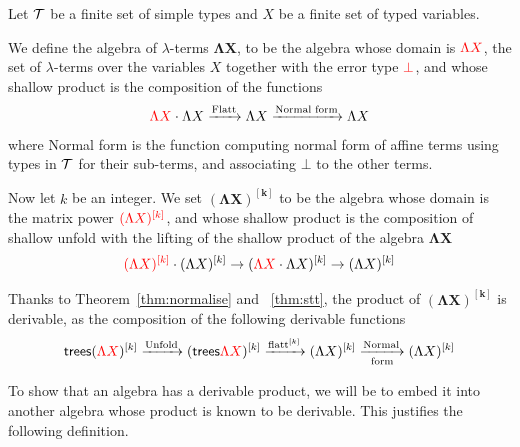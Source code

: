 \begin{example} Let $\Tt$ be a finite set of simple types and $X$ be a finite set of typed variables. 

We define the algebra of $\lambda$-terms $\mathbf{\Lambda X}$, to be the algebra whose domain is $\ranked{\Lambda X}$, the set of $\lambda$-terms over the variables $X$ together with the error type $\ranked{\bot}$, and whose shallow product is the composition of the functions
\begin{align*}
\ranked{\Lambda X}\cdot \Lambda X \xrightarrow{\text{Flatt}} \Lambda X \xrightarrow{\text{Normal form}} \Lambda X 
\end{align*}
where Normal form is the function computing normal form of affine terms using types in $\Tt$ for their sub-terms, and associating $\bot$ to the other terms. 



Now let $k$ be an integer. We set $\mathbf{(\Lambda X)^{[k]}}$ to be the algebra whose domain is the matrix power $\ranked{\mati k {(\Lambda X)}}$, and whose shallow product is the composition of shallow unfold with the lifting of the shallow product of the algebra $\mathbf{\Lambda X}$
\begin{align*}
\ranked{(\Lambda X)^{[k]}}\cdot (\Lambda X)^{[k]} \to (\ranked{\Lambda X}\cdot \Lambda X)^{[k]}  \to (\Lambda X)^{[k]} 
\end{align*}

Thanks to Theorem~\ref{thm:normalise} and ~\ref{thm:stt}, the product of $\mathbf{(\Lambda X)^{[k]}}$ is derivable, as the composition of the following derivable functions
\begin{align*}
\trees(\ranked{\Lambda X})^{[k]} \xrightarrow{\text{Unfold}} (\trees \ranked{\Lambda X})^{[k]} \xrightarrow{\text{flatt}^{[k]}} 
 (\Lambda X)^{[k]} \underset{\text{form}}{\xrightarrow{\text{Normal}}}  (\Lambda X)^{[k]}
\end{align*}
\end{example}

To show that an algebra has a derivable product, we will be to embed it into another algebra whose 
product is known to be derivable. This justifies the following definition.


